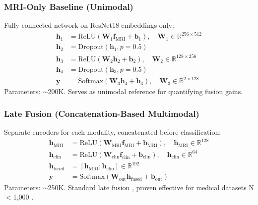 \documentclass[conference]{IEEEtran}
\begin{document}
\subsubsection{MRI-Only Baseline (Unimodal)}
Fully-connected network on ResNet18 embeddings only:
\begin{align}
\mathbf{h}_1 &= \text{ReLU}(\mathbf{W}_1 \mathbf{f}_{\text{MRI}} + \mathbf{b}_1), \quad \mathbf{W}_1 \in \mathbb{R}^{256 \times 512} \\
\mathbf{h}_2 &= \text{Dropout}(\mathbf{h}_1, p=0.5) \\
\mathbf{h}_3 &= \text{ReLU}(\mathbf{W}_2 \mathbf{h}_2 + \mathbf{b}_2), \quad \mathbf{W}_2 \in \mathbb{R}^{128 \times 256} \\
\mathbf{h}_4 &= \text{Dropout}(\mathbf{h}_3, p=0.5) \\
\mathbf{y} &= \text{Softmax}(\mathbf{W}_3 \mathbf{h}_4 + \mathbf{b}_3), \quad \mathbf{W}_3 \in \mathbb{R}^{2 \times 128}
\end{align}
Parameters: $\sim$200K. Serves as unimodal reference for quantifying fusion gains.

\subsubsection{Late Fusion (Concatenation-Based Multimodal)}
Separate encoders for each modality, concatenated before classification:
\begin{align}
\mathbf{h}_{\text{MRI}} &= \text{ReLU}(\mathbf{W}_{\text{MRI}} \mathbf{f}_{\text{MRI}} + \mathbf{b}_{\text{MRI}}), \quad \mathbf{h}_{\text{MRI}} \in \mathbb{R}^{128} \\
\mathbf{h}_{\text{clin}} &= \text{ReLU}(\mathbf{W}_{\text{clin}} \mathbf{f}_{\text{clin}} + \mathbf{b}_{\text{clin}}), \quad \mathbf{h}_{\text{clin}} \in \mathbb{R}^{64} \\
\mathbf{h}_{\text{fused}} &= [\mathbf{h}_{\text{MRI}}; \mathbf{h}_{\text{clin}}] \in \mathbb{R}^{192} \\
\mathbf{y} &= \text{Softmax}(\mathbf{W}_{\text{out}} \mathbf{h}_{\text{fused}} + \mathbf{b}_{\text{out}})
\end{align}
Parameters: $\sim$250K. Standard late fusion \cite{Kamnitsas2017}, proven effective for medical datasets N$<$1,000 \cite{Huang2020}.
\end{document}

